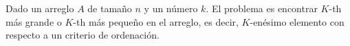 Dado un arreglo $A$ de tamaño $n$ y un número $k$. El problema es encontrar $K$-th más grande o $K$-th más pequeño en el arreglo, es decir, $K$-enésimo elemento con respecto a un criterio de ordenación.